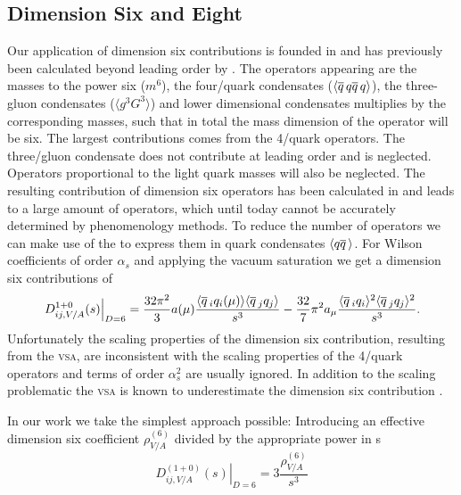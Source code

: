 \documentclass[../../index.tex]{subfiles}
\begin{document}
\subsection{Dimension Six and Eight}
Our application of dimension six contributions is founded in \cite{Braaten1991}
and has previously been calculated beyond leading order by \cite{Lanin1986}. The
operators appearing are the masses to the power six (\(m^6\)), the four\-/quark
condensates (\(\langle \overline{q}\, q \overline{q}\, q \rangle\)), the three-gluon
condensates (\(\langle g^3 G^3 \rangle\)) and lower dimensional condensates
multiplies by the corresponding masses, such that in total the mass dimension of
the operator will be six. The largest contributions comes from the 4\-/quark
operators. The three\-/gluon condensate does not contribute at leading order
\cite{Hubschmid1982} and is neglected. Operators proportional to the light quark
masses will also be neglected. The resulting contribution of dimension six
operators has been calculated in \cite{Laning1986} and leads to a large amount
of operators, which until today cannot be accurately determined by phenomenology
methods. To reduce the number of operators we can make use of the
\cite{Beneke2008,Braaten1991,Shifman1978} to express them in quark condensates
\(\langle q \overline{q}\, \rangle\). For Wilson coefficients of order \(\alpha_s\)
and applying the vacuum saturation we get a dimension six contributions of
\begin{equation}
  \left. D_{ij,V/A}^{1+0}(s) \right\vert_{D=6} = \frac{32\pi^2}{3} a(\mu) \frac{\langle \overline{q}\,_iq_i(\mu) \rangle\langle \overline{q}\,_jq_j \rangle}{s^3}
  - \frac{32}{7} \pi^2 a_\mu \frac{\langle \overline{q}\,_i q_i \rangle^2 \langle \overline{q}\,_j q_j \rangle^2}{s^3}.
\end{equation}
Unfortunately the scaling properties of the dimension six contribution,
resulting from the \textsc{vsa}, are inconsistent with the scaling properties of
the 4\-/quark operators \cite{Narison1983,Jamin1985} and terms of order
\(\alpha_s^2\) are usually ignored. In addition to the scaling problematic the
\textsc{vsa} is known to underestimate the dimension six contribution
\cite{Launer1983}.

In our work we take the simplest approach possible: Introducing an effective
dimension six coefficient \(\rho_{V/A}^{(6)}\) divided by the appropriate power in
s
\begin{equation}
  \left. D_{ij,V/A}^{(1+0)}(s) \right\rvert_{D=6} = 3 \frac{\rho_{V/A}^{(6)}}{s^3}
\end{equation}
\end{document}
